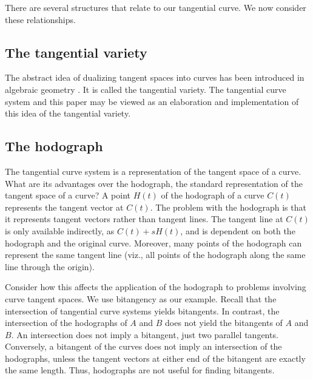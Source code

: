 \documentclass[12pt]{article}
\begin{document}
There are several structures that relate to our tangential curve.
We now consider these relationships.


\subsection{The tangential variety}

The abstract idea of dualizing tangent spaces into curves
has been introduced in algebraic geometry \cite[p. 54]{hartshorne77}.
It is called the tangential variety.
The tangential curve system and this paper may be viewed as an elaboration
and implementation of this idea of the tangential variety.


\subsection{The hodograph}
\label{sec:hodo}

The tangential curve system is a representation of the tangent space of a curve.
What are its advantages over the hodograph, the standard representation of 
the tangent space of a curve?
A point $H(t)$ of the hodograph of a curve $C(t)$ represents the tangent 
vector at $C(t)$.
The problem with the hodograph is that it represents tangent vectors rather
than tangent lines.
The tangent line at $C(t)$ is only available indirectly, as $C(t) + sH(t)$,
and is dependent on both the hodograph and the original curve.
Moreover, many points of the hodograph can represent the same 
tangent line (viz., all points of the hodograph along the same line through the origin).

Consider how this affects the application of the hodograph to problems
involving curve tangent spaces.
We use bitangency as our example.
Recall that the intersection of tangential curve systems yields bitangents.
In contrast, the intersection of the hodographs of $A$ and $B$ does not yield the 
bitangents of $A$ and $B$.
An intersection does not imply a bitangent, just two parallel tangents.
Conversely, a bitangent of the curves does not imply an intersection
of the hodographs, unless the tangent vectors at either end of the bitangent
are exactly the same length.
Thus, hodographs are not useful for finding bitangents.
\end{document}
